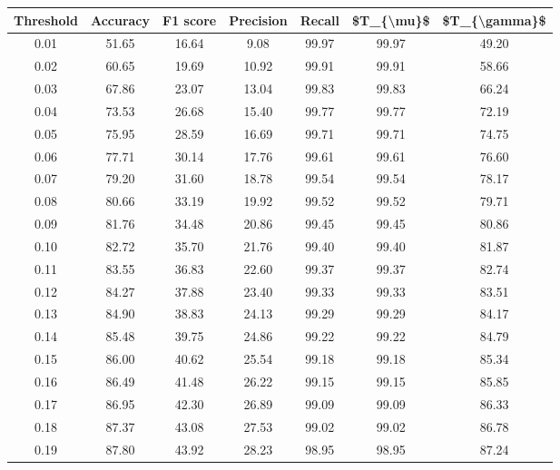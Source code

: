 \begin{tabular}{|c|c|c|c|c|c|c|}
\toprule
 Threshold &  Accuracy &  F1 score &  Precision &  Recall &  \$T\_\{\textbackslash mu\}\$ &  \$T\_\{\textbackslash gamma\}\$ \\
\hline
      0.01 &     51.65 &     16.64 &       9.08 &   99.97 &      99.97 &         49.20 \\
      0.02 &     60.65 &     19.69 &      10.92 &   99.91 &      99.91 &         58.66 \\
      0.03 &     67.86 &     23.07 &      13.04 &   99.83 &      99.83 &         66.24 \\
      0.04 &     73.53 &     26.68 &      15.40 &   99.77 &      99.77 &         72.19 \\
      0.05 &     75.95 &     28.59 &      16.69 &   99.71 &      99.71 &         74.75 \\
      0.06 &     77.71 &     30.14 &      17.76 &   99.61 &      99.61 &         76.60 \\
      0.07 &     79.20 &     31.60 &      18.78 &   99.54 &      99.54 &         78.17 \\
      0.08 &     80.66 &     33.19 &      19.92 &   99.52 &      99.52 &         79.71 \\
      0.09 &     81.76 &     34.48 &      20.86 &   99.45 &      99.45 &         80.86 \\
      0.10 &     82.72 &     35.70 &      21.76 &   99.40 &      99.40 &         81.87 \\
      0.11 &     83.55 &     36.83 &      22.60 &   99.37 &      99.37 &         82.74 \\
      0.12 &     84.27 &     37.88 &      23.40 &   99.33 &      99.33 &         83.51 \\
      0.13 &     84.90 &     38.83 &      24.13 &   99.29 &      99.29 &         84.17 \\
      0.14 &     85.48 &     39.75 &      24.86 &   99.22 &      99.22 &         84.79 \\
      0.15 &     86.00 &     40.62 &      25.54 &   99.18 &      99.18 &         85.34 \\
      0.16 &     86.49 &     41.48 &      26.22 &   99.15 &      99.15 &         85.85 \\
      0.17 &     86.95 &     42.30 &      26.89 &   99.09 &      99.09 &         86.33 \\
      0.18 &     87.37 &     43.08 &      27.53 &   99.02 &      99.02 &         86.78 \\
      0.19 &     87.80 &     43.92 &      28.23 &   98.95 &      98.95 &         87.24 \\

\end{tabular}
